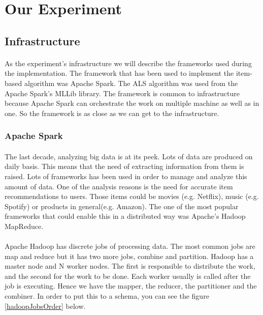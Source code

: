 \newpage
\section{Our Experiment}
\subsection{Infrastructure}
\paragraph{}As the experiment's infrastructure we will describe the frameworks used during the implementation. The framework that has been used to implement the item-based algorithm was Apache Spark. The ALS algorithm was used from the Apache Spark's MLLib library. The framework is common to infrastructure because Apache Spark can orchestrate the work on multiple machine as well as in one. So the framework is as close as we can get to the infrastructure.

\subsubsection{Apache Spark}
\paragraph{}The last decade, analyzing big data is at its peek. Lots of data are produced on daily basis. This means that the need of extracting information from them is raised. 
Lots of frameworks has been used in order to manage and analyze this amount of data. One of the analysis reasons is the need for accurate item recommendations to users. Those items could be movies (e.g. Netflix), music (e.g. Spotify) or products in general(e.g. Amazon). The one of the most popular frameworks that could enable this in a distributed way was Apache's Hadoop MapReduce.


\paragraph{}Apache Hadoop has discrete jobs of processing data. The most common jobs are map and reduce but it has two more jobs, combine and partition. Hadoop has a master node and N worker nodes. The first is responsible to distribute the work, and the second for the work to be done. Each worker usually is called after the job is executing. Hence we have the mapper, the reducer, the partitioner and the combiner. In order to put this to a schema, you can see the figure \ref{hadoopJobsOrder} below.

